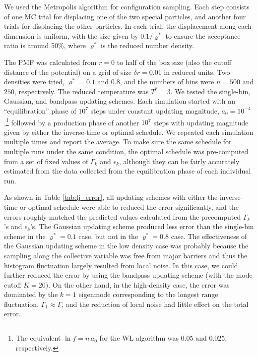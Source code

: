 \documentclass[reprint, superscriptaddress, floatfix]{revtex4-1}
\begin{document}
We used the Metropolis algorithm\cite{frenkel, metropolis1953}
for configuration sampling.
%
Each step consists of
one MC trial for displacing one of the two special particles,
and another four trials for displacing the other particles.
%
In each trial, the displacement along each dimension is uniform,
with the size given by $0.1/\varrho^*$
to ensure the acceptance ratio is around 50\%,
where $\varrho^*$ is the reduced number density.


The PMF was calculated from $r = 0$ to half of the box size
(also the cutoff distance of the potential)
on a grid of size $\delta r = 0.01$ in reduced units.
%
Two densities were tried, $\varrho^* = 0.1$ and $0.8$,
and the numbers of bins were $n = 500$ and $250$, respectively.
%
The reduced temperature was $T^* = 3$.
%
We tested the single-bin, Gaussian, and bandpass updating schemes.
%
Each simulation started with an ``equilibration'' phase
of $10^7$ steps under constant updating magnitude,
$a_0 = 10^{-4}$,\footnote{The equivalent $\ln f = n \, a_0$ for the WL algorithm
was $0.05$ and $0.025$, respectively.}
followed by a production phase of another $10^7$ steps
with updating magnitude given by
either the inverse-time or optimal schedule.
%
We repeated each simulation multiple times
and report the average.
%
To make sure the same schedule for multiple runs under the same condition,
the optimal schedule was pre-computed from a set of fixed values of
$\Gamma_k$ and $\epsilon_k$,
although they can be fairly accurately estimated from the data
collected from the equilibration phase of each individual run.



As shown in Table \ref{tab:lj_error},
all updating schemes
with either the inverse-time or optimal schedule
were able to reduced
the error significantly,
and the errors roughly matched the predicted values
calculated from the precomputed
$\Gamma_k$'s and $\epsilon_k$'s.
%
The Gaussian updating scheme produced less error than
the single-bin scheme in the $\varrho^* = 0.1$ case,
but not in the $\varrho^* = 0.8$ case.
%
The effectiveness of the Gaussian updating scheme
in the low density case
was probably because the sampling along
the collective variable was free from major barriers
and thus the histogram fluctuation largely
resulted from local noise.
%
In this case, we could further reduced the error
by using the bandpass updating scheme
(with the mode cutoff $K = 20$).
%
On the other hand, in the high-density case,
the error was dominated by the $k=1$ eigenmode
corresponding to the longest range fluctuation,
$\Gamma_1 \approx \Gamma$,
and the reduction of local noise
had little effect on the total error.
\end{document}
